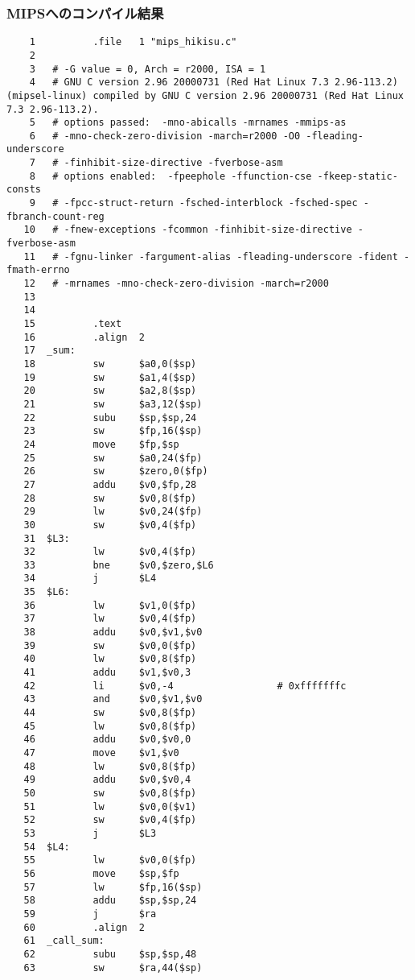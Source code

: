 \documentclass[a4j,11pt]{jarticle}
\begin{document}
  \subsubsection{MIPSへのコンパイル結果}
  \begin{verbatim}
    1          .file   1 "mips_hikisu.c"
    2
    3   # -G value = 0, Arch = r2000, ISA = 1
    4   # GNU C version 2.96 20000731 (Red Hat Linux 7.3 2.96-113.2) (mipsel-linux) compiled by GNU C version 2.96 20000731 (Red Hat Linux 7.3 2.96-113.2).       
    5   # options passed:  -mno-abicalls -mrnames -mmips-as
    6   # -mno-check-zero-division -march=r2000 -O0 -fleading-underscore
    7   # -finhibit-size-directive -fverbose-asm
    8   # options enabled:  -fpeephole -ffunction-cse -fkeep-static-consts
    9   # -fpcc-struct-return -fsched-interblock -fsched-spec -fbranch-count-reg
   10   # -fnew-exceptions -fcommon -finhibit-size-directive -fverbose-asm
   11   # -fgnu-linker -fargument-alias -fleading-underscore -fident -fmath-errno
   12   # -mrnames -mno-check-zero-division -march=r2000
   13
   14
   15          .text
   16          .align  2
   17  _sum:
   18          sw      $a0,0($sp)
   19          sw      $a1,4($sp)
   20          sw      $a2,8($sp)
   21          sw      $a3,12($sp)
   22          subu    $sp,$sp,24
   23          sw      $fp,16($sp)
   24          move    $fp,$sp
   25          sw      $a0,24($fp)
   26          sw      $zero,0($fp)
   27          addu    $v0,$fp,28
   28          sw      $v0,8($fp)
   29          lw      $v0,24($fp)
   30          sw      $v0,4($fp)
   31  $L3:
   32          lw      $v0,4($fp)
   33          bne     $v0,$zero,$L6
   34          j       $L4
   35  $L6:
   36          lw      $v1,0($fp)
   37          lw      $v0,4($fp)
   38          addu    $v0,$v1,$v0
   39          sw      $v0,0($fp)
   40          lw      $v0,8($fp)
   41          addu    $v1,$v0,3
   42          li      $v0,-4                  # 0xfffffffc
   43          and     $v0,$v1,$v0
   44          sw      $v0,8($fp)
   45          lw      $v0,8($fp)
   46          addu    $v0,$v0,0
   47          move    $v1,$v0
   48          lw      $v0,8($fp)
   49          addu    $v0,$v0,4
   50          sw      $v0,8($fp)
   51          lw      $v0,0($v1)
   52          sw      $v0,4($fp)
   53          j       $L3
   54  $L4:
   55          lw      $v0,0($fp)
   56          move    $sp,$fp
   57          lw      $fp,16($sp)
   58          addu    $sp,$sp,24
   59          j       $ra
   60          .align  2
   61  _call_sum:
   62          subu    $sp,$sp,48
   63          sw      $ra,44($sp)

\end{verbatim}
\end{document}
